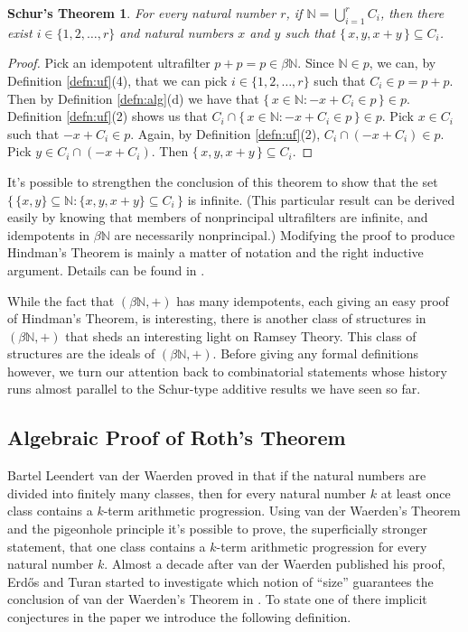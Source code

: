 \documentclass[12pt]{article}
\theoremstyle{plain}
\newtheorem{schur}[thm]{Schur's Theorem}
\theoremstyle{definition}
\newcommand{\bbN}{\mathbb{N}}
\begin{document}
  \begin{schur}
    For every natural number $r$, if  \/ $\bbN = \bigcup_{i=1}^r C_i$,
    then there exist $i \in \{1, 2, \ldots, r\}$ and natural numbers
    $x$ and $y$ such that $\{\, x, y, x+y \,\} \subseteq C_i$.
  \end{schur}
  \begin{proof}
    Pick an idempotent ultrafilter $p + p = p \in \beta\bbN$. 
    Since $\bbN \in p$, we can, by Definition \ref{defn:uf}(4),
    that we can pick $i \in \{1, 2, \ldots, r\}$ such that $C_i \in p
    = p + p$. 
    Then by Definition \ref{defn:alg}(d) we have that $\{\, x \in \bbN : -x
    + C_i \in p \,\} \in p$.
    Definition \ref{defn:uf}(2) shows us that $C_i \cap
    \{\, x\in \bbN : -x + C_i \in p \,\} \in p$.
    Pick $x \in C_i$ such that $-x+C_i \in p$.
    Again, by Definition \ref{defn:uf}(2), $C_i \cap (-x+C_i) \in p$.
    Pick $y \in C_i \cap (-x+C_i)$.
    Then $\{\, x, y, x+y\,\} \subseteq C_i$.
  \end{proof}
It's possible to strengthen the conclusion of this theorem to show
that the set $\bigl\{\, \{x, y\} \subseteq \bbN : \{x, y, x+y\}
\subseteq C_i\,\bigr\}$ is infinite.
(This particular result can be derived easily by knowing that members
of nonprincipal ultrafilters are infinite, and idempotents in
$\beta\bbN$ are necessarily nonprincipal.)
Modifying the proof to produce Hindman's Theorem is mainly a matter of
notation and the right inductive argument.
Details can be found in \cite[Theorem 5.8]{Hindman:1998fk}. 

While the fact that $(\beta\bbN, +)$ has many idempotents, each giving
an easy proof of Hindman's Theorem, is interesting, there is another
class of structures in $(\beta\bbN, +)$ that sheds an interesting
light on Ramsey Theory. 
This class of structures are the ideals of $(\beta\bbN, +)$.
Before giving any formal definitions however, we turn our attention
back to combinatorial statements whose history runs almost parallel to
the Schur-type additive results we have seen so far.

\subsection{Algebraic Proof of Roth's Theorem}
Bartel Leendert van der Waerden proved in
\cite{Van-der-Waerden:1927fk} that if the natural numbers are divided
into finitely many classes, then for every natural number $k$ at least
once class contains a $k$-term arithmetic progression. 
Using van der Waerden's Theorem and the pigeonhole principle it's
possible to prove, the superficially stronger statement, that one
class contains a $k$-term arithmetic progression for every natural
number $k$. 
Almost a decade after van der Waerden published his proof, Erd\H{o}s
and Turan started to investigate which notion of ``size'' guarantees
the conclusion of van der Waerden's Theorem in \cite{Erdos:1936fk}.
To state one of there implicit conjectures in the paper we introduce
the following definition.
\end{document}
